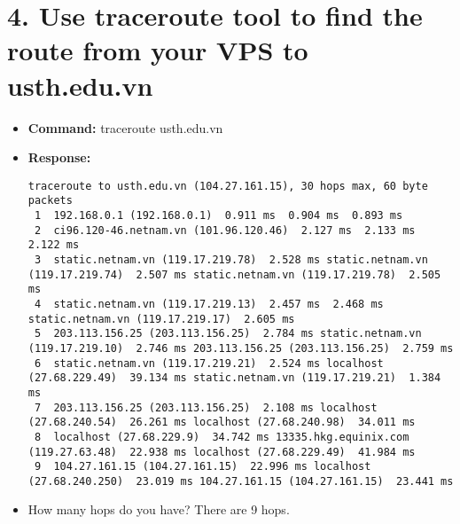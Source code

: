 \documentclass[11pt, oneside]{report}
\begin{document}
\section*{4. Use traceroute tool to find the route from your VPS to usth.edu.vn}
\begin{itemize}
\item \textbf{Command:} traceroute usth.edu.vn
\item \textbf{Response:}
\begin{lstlisting}
traceroute to usth.edu.vn (104.27.161.15), 30 hops max, 60 byte packets
 1  192.168.0.1 (192.168.0.1)  0.911 ms  0.904 ms  0.893 ms
 2  ci96.120-46.netnam.vn (101.96.120.46)  2.127 ms  2.133 ms  2.122 ms
 3  static.netnam.vn (119.17.219.78)  2.528 ms static.netnam.vn (119.17.219.74)  2.507 ms static.netnam.vn (119.17.219.78)  2.505 ms
 4  static.netnam.vn (119.17.219.13)  2.457 ms  2.468 ms static.netnam.vn (119.17.219.17)  2.605 ms
 5  203.113.156.25 (203.113.156.25)  2.784 ms static.netnam.vn (119.17.219.10)  2.746 ms 203.113.156.25 (203.113.156.25)  2.759 ms
 6  static.netnam.vn (119.17.219.21)  2.524 ms localhost (27.68.229.49)  39.134 ms static.netnam.vn (119.17.219.21)  1.384 ms
 7  203.113.156.25 (203.113.156.25)  2.108 ms localhost (27.68.240.54)  26.261 ms localhost (27.68.240.98)  34.011 ms
 8  localhost (27.68.229.9)  34.742 ms 13335.hkg.equinix.com (119.27.63.48)  22.938 ms localhost (27.68.229.49)  41.984 ms
 9  104.27.161.15 (104.27.161.15)  22.996 ms localhost (27.68.240.250)  23.019 ms 104.27.161.15 (104.27.161.15)  23.441 ms
\end{lstlisting}
\item How many hops do you have? There are 9 hops.
\end{itemize}
\end{document}
